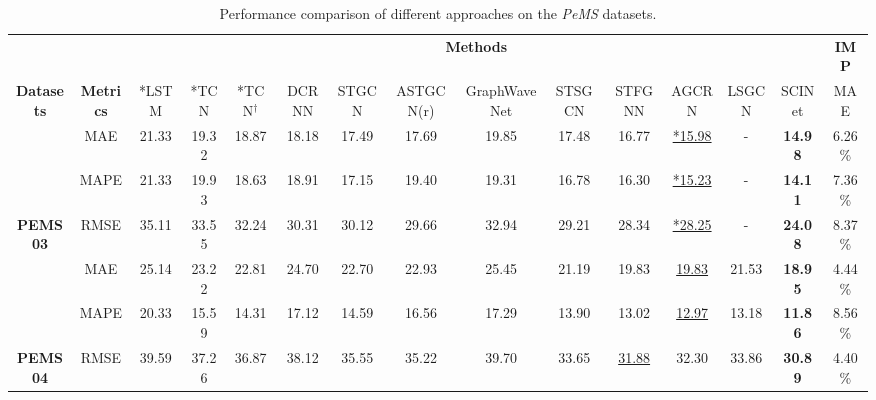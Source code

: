 \documentclass{article}
\begin{document}
\begin{table*}[h]	
\caption{Performance comparison of different approaches on the \emph{PeMS} datasets.}
\begin{threeparttable} \resizebox{\textwidth}{!}
{
\begin{tabular}{c|c|c|c|c|c|c|c|c|c|c|c|c|c|c}
\hline
                                    &                                    & \multicolumn{12}{c|}{\textbf{Methods}}                                                                                                                                                         & \textbf{IMP}                      \\ \cline{3-15} 
\multirow{-2}{*}{\textbf{Datasets}} & \multirow{-2}{*}{\textbf{Metrics}} & *LSTM  & *TCN  & *TCN$^{\dagger}$ & DCRNN & STGCN & ASTGCN(r) & GraphWaveNet & STSGCN & STFGNN                                     & AGCRN                                       & LSGCN & SCINet         & MAE          \\ \hline
                                    & MAE                                & 21.33 & 19.32 & 18.87 & 18.18 & 17.49 & 17.69     & 19.85        & 17.48  & 16.77                                       & {\color[RGB]{0, 100, 148} \underline{ *15.98}} & -     & \textbf{14.98} & {\color[RGB]{230, 57, 70}  6.26\%}  \\ & MAPE                               & 21.33 & 19.93 & 18.63 & 18.91 & 17.15 & 19.40     & 19.31        & 16.78  & 16.30                                       & {\color[RGB]{0, 100, 148} \underline{ *15.23}} & -     & \textbf{14.11} & {\color[RGB]{230, 57, 70}  7.36\%}  \\ \multirow{-3}{*}{\textbf{PEMS03}}   & RMSE                               & 35.11 & 33.55 & 32.24 & 30.31 & 30.12 & 29.66     & 32.94        & 29.21  & 28.34 & {\color[RGB]{0, 100, 148} \underline{ *28.25 }}                                      & -     & \textbf{24.08} & {\color[RGB]{230, 57, 70}  8.37\%}  \\ \hline
                                    & MAE                                & 25.14 & 23.22 & 22.81 & 24.70 & 22.70 & 22.93     & 25.45        & 21.19  & 19.83                                    & {\color[RGB]{0, 100, 148} \underline{ 19.83}} & 21.53 & \textbf{18.95} & {\color[RGB]{230, 57, 70}  4.44\%}  \\ & MAPE                               & 20.33 & 15.59 & 14.31 & 17.12 & 14.59 & 16.56     & 17.29        & 13.90  & 13.02                                       & {\color[RGB]{0, 100, 148} \underline{ 12.97}} & 13.18 & \textbf{11.86} & {\color[RGB]{230, 57, 70} 8.56\%} \\ \multirow{-3}{*}{\textbf{PEMS04}}   & RMSE                               & 39.59 & 37.26 & 36.87 & 38.12 & 35.55 & 35.22     & 39.70        & 33.65  & {\color[RGB]{0, 100, 148} \underline{ 31.88}}                                       & 32.30 & 33.86 & \textbf{30.89} & {\color[RGB]{230, 57, 70}  4.40\%}  \\ \hline

\end{tabular}}
\end{threeparttable}
\end{table*}
\end{document}
